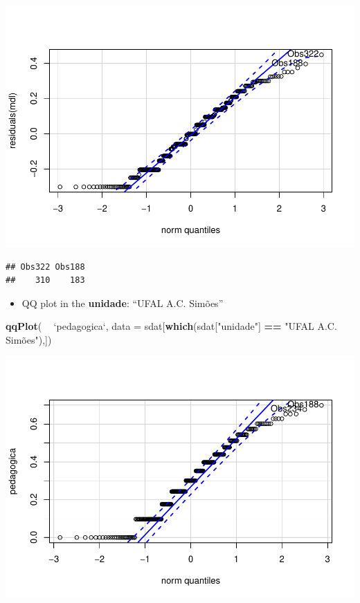 \documentclass[]{article}
\newenvironment{Shaded}{\begin{snugshade}}{\end{snugshade}}
\newcommand{\DataTypeTok}[1]{\textcolor[rgb]{0.13,0.29,0.53}{#1}}
\newcommand{\KeywordTok}[1]{\textcolor[rgb]{0.13,0.29,0.53}{\textbf{#1}}}
\newcommand{\NormalTok}[1]{#1}
\newcommand{\OperatorTok}[1]{\textcolor[rgb]{0.81,0.36,0.00}{\textbf{#1}}}
\newcommand{\StringTok}[1]{\textcolor[rgb]{0.31,0.60,0.02}{#1}}
\providecommand{\tightlist}{%
  \setlength{\itemsep}{0pt}\setlength{\parskip}{0pt}}
\begin{document}
\includegraphics{factorialAnova_files/figure-latex/unnamed-chunk-19-1.pdf}

\begin{verbatim}
## Obs322 Obs188 
##    310    183
\end{verbatim}

\begin{itemize}
\tightlist
\item
  QQ plot in the \textbf{unidade}: ``UFAL A.C. Simões''
\end{itemize}

\begin{Shaded}
\begin{Highlighting}[]
\KeywordTok{qqPlot}\NormalTok{( }\OperatorTok{~}\StringTok{ `}\DataTypeTok{pedagogica}\StringTok{`}\NormalTok{, }\DataTypeTok{data =}\NormalTok{ sdat[}\KeywordTok{which}\NormalTok{(sdat[}\StringTok{"unidade"}\NormalTok{] }\OperatorTok{==}\StringTok{ "UFAL A.C. Simões"),])}
\end{Highlighting}
\end{Shaded}

\includegraphics{factorialAnova_files/figure-latex/unnamed-chunk-20-1.pdf}
\end{document}
